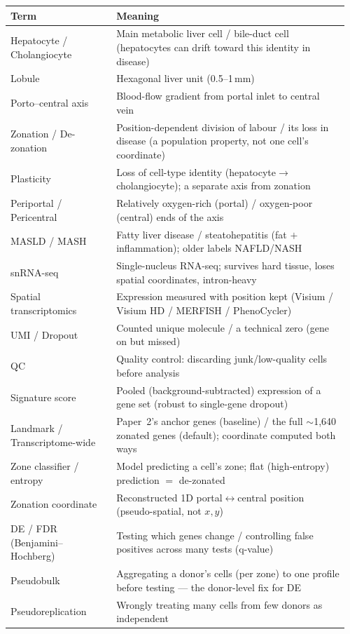 \documentclass[11pt]{article}
\begin{document}
\begin{table}[h]
\centering\small
\begin{tabular}{@{}p{0.30\linewidth} p{0.66\linewidth}@{}}
\toprule
\textbf{Term} & \textbf{Meaning}\\
\midrule
Hepatocyte / Cholangiocyte & Main metabolic liver cell / bile-duct cell (hepatocytes can drift toward
this identity in disease)\\
Lobule & Hexagonal liver unit (0.5--1\,mm)\\
Porto--central axis & Blood-flow gradient from portal inlet to central vein\\
Zonation / De-zonation & Position-dependent division of labour / its loss in disease (a population
property, not one cell's coordinate)\\
Plasticity & Loss of cell-type identity (hepatocyte$\to$cholangiocyte); a separate axis from zonation\\
Periportal / Pericentral & Relatively oxygen-rich (portal) / oxygen-poor (central) ends of the axis\\
MASLD / MASH & Fatty liver disease / steatohepatitis (fat $+$ inflammation); older labels NAFLD/NASH\\
snRNA-seq & Single-nucleus RNA-seq; survives hard tissue, loses spatial coordinates, intron-heavy\\
Spatial transcriptomics & Expression measured with position kept (Visium / Visium HD / MERFISH /
PhenoCycler)\\
UMI / Dropout & Counted unique molecule / a technical zero (gene on but missed)\\
QC & Quality control: discarding junk/low-quality cells before analysis\\
Signature score & Pooled (background-subtracted) expression of a gene set (robust to single-gene
dropout)\\
Landmark / Transcriptome-wide & Paper~2's anchor genes (baseline) / the full $\sim$1{,}640 zonated genes
(default); coordinate computed both ways\\
Zone classifier / entropy & Model predicting a cell's zone; flat (high-entropy) prediction $=$
de-zonated\\
Zonation coordinate & Reconstructed 1D portal$\leftrightarrow$central position (pseudo-spatial, not
$x,y$)\\
DE / FDR (Benjamini--Hochberg) & Testing which genes change / controlling false positives across many
tests (q-value)\\
Pseudobulk & Aggregating a donor's cells (per zone) to one profile before testing --- the donor-level
fix for DE\\
Pseudoreplication & Wrongly treating many cells from few donors as independent\\
\bottomrule
\end{tabular}
\end{table}
\end{document}
